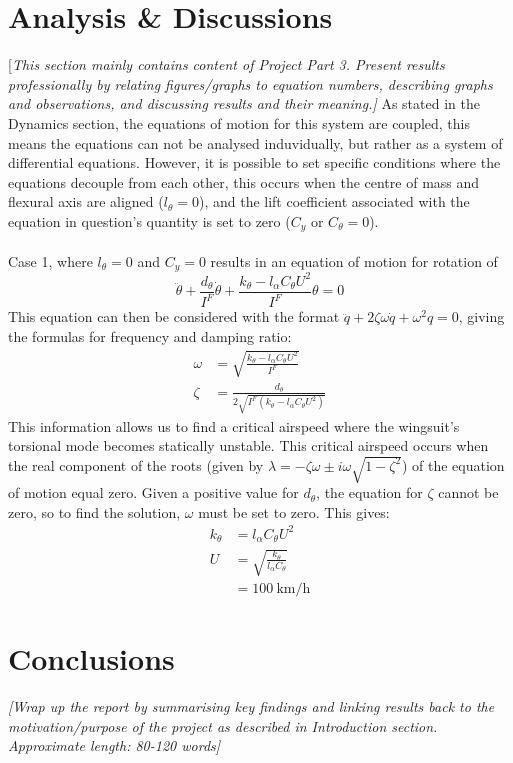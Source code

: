 \documentclass[11pt]{article}
\begin{document}
\section*{Analysis \& Discussions}\label{sec:anal_disc}
[\textcolor[rgb]{0.80,0.29,0.09}{\textsl{This section mainly contains content of Project Part 3. Present results professionally by relating figures/graphs to equation numbers, describing graphs and observations, and discussing results and their meaning.]}}
As stated in the Dynamics section, the equations of motion for this system are coupled, this means the equations can not be analysed induvidually, but rather as a system of differential equations.
However, it is possible to set specific conditions where the equations decouple from each other, this occurs when the centre of mass and flexural axis are aligned ($l_{\theta} = 0$), and the lift coefficient associated with the equation in question's quantity is set to zero ($C_y$ or $C_{\theta} = 0 $). \\\\
Case 1, where $l_{\theta} = 0$ and $C_y = 0$ results in an equation of motion for rotation of
\begin{equation}
  \ddot{\theta}+\frac{d_{\theta}}{I^F}\dot{\theta}+\frac{k_{\theta}-l_{\alpha}C_{\theta}U^2}{I^F}\theta = 0 \label{eq:decoupled1}
\end{equation}
This equation can then be considered with the format $\ddot{q} + 2\zeta\omega\dot{q}+\omega^2q = 0$, giving the formulas for frequency and damping ratio:
\begin{align*}
  \omega &= \sqrt{\frac{k_{\theta}-l_{\alpha}C_{\theta}U^2}{I^F}} \\
  \zeta &= \frac{d_{\theta}}{2\sqrt{I^F(k_{\theta}-l_{\alpha}C_{\theta}U^2)}}
\end{align*}
This information allows us to find a critical airspeed where the wingsuit's torsional mode becomes statically unstable.
This critical airspeed occurs when the real component of the roots (given by $\lambda = -\zeta\omega\pm i\omega\sqrt{1-\zeta^2}$) of the equation of motion equal zero.
Given a positive value for $d_{\theta}$, the equation for $\zeta$ cannot be zero, so to find the solution, $\omega$ must be set to zero. This gives:
\begin{align*}
  k_{\theta} &= l_{\alpha}C_{\theta}U^2 \\
  U &= \sqrt{\frac{k_{\theta}}{l_{\alpha}C_{\theta}}}\\
    &= 100~\mathrm{km/h}
\end{align*}


\section*{Conclusions}\label{sec:conclusion}
\textcolor[rgb]{0.80,0.29,0.09}{\textsl{[Wrap up the report by summarising key findings and linking results back to the motivation/purpose of the project as described in Introduction section. Approximate length: 80-120 words]}}


{}

\end{document}
